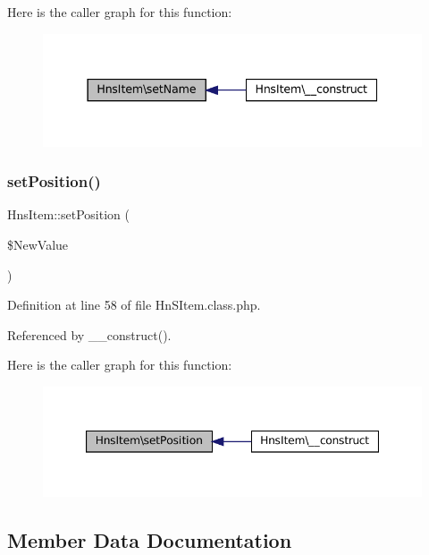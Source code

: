 Here is the caller graph for this function\+:\nopagebreak
\begin{figure}[H]
\begin{center}
\leavevmode
\includegraphics[width=337pt]{class_hns_item_a347826422c7beca099e7e82c87e4348b_icgraph}
\end{center}
\end{figure}
\mbox{\label{class_hns_item_a0705d47d8fe9bb296e5fac7c23b3752a}} 
\subsubsection{\texorpdfstring{set\+Position()}{setPosition()}}
{\footnotesize\ttfamily Hns\+Item\+::set\+Position (\begin{DoxyParamCaption}\item[{}]{\$\+New\+Value }\end{DoxyParamCaption})}



Definition at line 58 of file Hn\+S\+Item.\+class.\+php.



Referenced by \+\_\+\+\_\+construct().

Here is the caller graph for this function\+:\nopagebreak
\begin{figure}[H]
\begin{center}
\leavevmode
\includegraphics[width=347pt]{class_hns_item_a0705d47d8fe9bb296e5fac7c23b3752a_icgraph}
\end{center}
\end{figure}


\subsection{Member Data Documentation}
\mbox{\label{class_hns_item_a60301d7055c910c2005ea444002d9acf}} 
